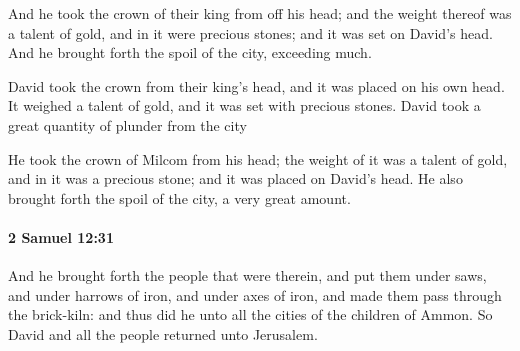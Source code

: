 			\begin{versebox}
					\item[BHS] 
					\item[ASV] And he took the crown of their king from off his head; and the weight thereof was a talent of gold, and in it were precious stones; and it was set on David's head. And he brought forth the spoil of the city, exceeding much.
					\item[NIV] David took the crown from their king’s head, and it was placed on his own head. It weighed a talent of gold, and it was set with precious stones. David took a great quantity of plunder from the city
					\item[NRSV] He took the crown of Milcom from his head; the weight of it was a talent of gold, and in it was a precious stone; and it was placed on David’s head. He also brought forth the spoil of the city, a very great amount.
			\end{versebox}

		\paragraph{2 Samuel 12:31} %
			\label{2SAMUEL-12-31}

			And he brought forth the people that were therein, and put them under saws, and under harrows of iron, and under axes of iron, and made them pass through the brick-kiln: and thus did he unto all the cities of the children of Ammon. So David and all the people returned unto Jerusalem.


